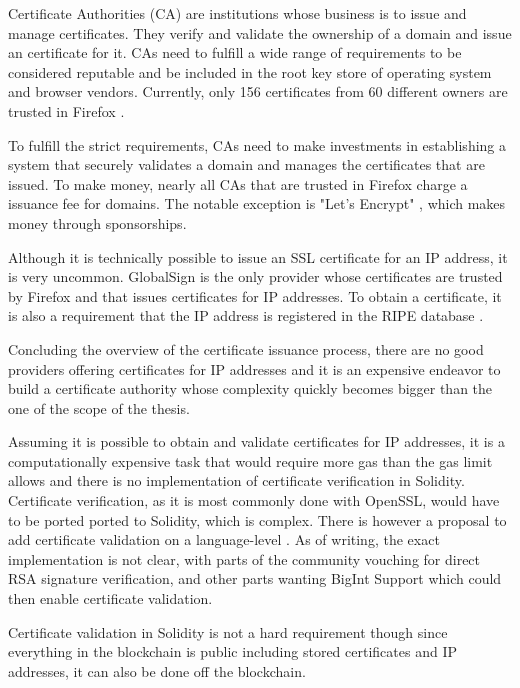 Certificate Authorities (CA) are institutions whose business is to issue and manage certificates. They verify and validate the ownership of a domain and issue an certificate for it. CAs need to fulfill a wide range of requirements \cite{BaselineRequirements} to be considered reputable and be included in the root key store of operating system and browser vendors. Currently, only 156 certificates from 60 different owners are trusted in Firefox \cite{httpscca67}.

To fulfill the strict requirements, CAs need to make investments in establishing a system that securely validates a domain and manages the certificates that are issued. To make money, nearly all CAs that are trusted in Firefox charge a issuance fee for domains. The notable exception is "Let's Encrypt" \cite{LetsEncrypt}, which makes money through sponsorships.

Although it is technically possible to issue an SSL certificate for an IP address, it is very uncommon. GlobalSign \cite{GlobalSign} is the only provider whose certificates are trusted by Firefox and that issues certificates for IP addresses. To obtain a certificate, it is also a requirement that the IP address is registered in the RIPE database \cite{Database95}.

Concluding the overview of the certificate issuance process, there are no good providers offering certificates for IP addresses and it is an expensive endeavor to build a certificate authority whose complexity quickly becomes bigger than the one of the scope of the thesis.

Assuming it is possible to obtain and validate certificates for IP addresses, it is a computationally expensive task that would require more gas than the gas limit allows and there is no implementation of certificate verification in Solidity. Certificate verification, as it is most commonly done with OpenSSL, would have to be ported ported to Solidity, which is complex.
There is however a proposal to add certificate validation on a language-level \cite{EIP74}. As of writing, the exact implementation is not clear, with parts of the community vouching for direct RSA signature verification, and other parts wanting BigInt Support which could then enable certificate validation.

Certificate validation in Solidity is not a hard requirement though \textemdash{} since everything in the blockchain is public including stored certificates and IP addresses, it can also be done off the blockchain. 

